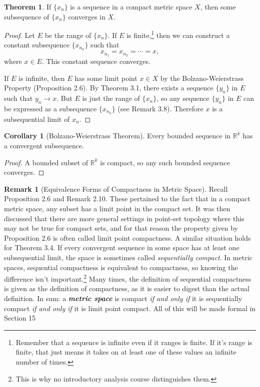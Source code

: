\documentclass{article}
\newcommand{\R}{\mathbb{R}}
\theoremstyle{definition}
\newtheorem{theorem}{Theorem}[section]
\newtheorem{corollary}{Corollary}[section]
\newtheorem{remark}{Remark}[section]
\begin{document}
\begin{theorem}
	If $ \{x_n\} $ is a sequence in a compact metric space $ X $, then some subsequence of $ \{x_n\} $ converges in $ X $. 
\end{theorem}
\begin{proof}
	Let $ E $ be the range of $ \{x_n\} $. If $ E $ is finite,\footnote{Remember that a sequence is infinite even if it ranges is finite. If it's range is finite, that just means it takes on at least one of these values an infinite number of times.} then we can construct a constant subsequence $ \{x_{n_k}\} $ such that $$x_{n_1}=x_{n_2}=\cdots= x ,$$ where $ x\in E $. This constant sequence converges.
	
	If $ E $ is infinite, then $ E $ has some limit point $ x\in X $ by the Bolzano-Weierstrass Property (Proposition 2.6). By Theorem 3.1, there exists a sequence $ \{y_n\} $ in $ E $ such that $ y_n\to x $. But $ E $ is just the range of $ \{x_n\} $, so any sequence $ \{y_n\} $ in $ E $ can be expressed as a subsequence $ \{x_{n_k}\} $ (see Remark 3.8). Therefore $ x $ is a subsequential limit of $ {x_n} $.  
\end{proof}
\begin{corollary}[Bolzano-Weierstrass Theorem]
	Every bounded sequence in $ \R^k $ has a convergent subsequence. 
\end{corollary}
\begin{proof}
	A bounded subset of $ \R^k $ is compact, so any such bounded sequence converges. 
\end{proof}
\begin{remark}[Equivalence Forms of Compactness in Metric Space]
	Recall Proposition 2.6 and Remark 2.10. These pertained to the fact that in a compact metric space, any subset has a limit point in the compact set. It was then discussed that there are more general settings in point-set topology where this may not be true for compact sets, and for that reason the property given by Proposition 2.6 is often called limit point compactness. A similar situation holds for Theorem 3.4. If every convergent sequence in some space has at least one subsequential limit, the space is sometimes called \textit{\color{red}sequentially compact}. In metric spaces, sequential compactness is equivalent to compactness, so knowing the difference isn't important.\footnote{This is why no introductory analysis course distinguishes them.} Many times, the definition of sequential compactness is given as the definition of compactness, as it is easier to digest than the actual definition. In sum: a \textit{\textbf{metric space}} is compact \textit{if and only if} it is sequentially compact \textit{if and only if} it is limit point compact. All of this will be made formal in Section 15 
\end{remark}
\end{document}

